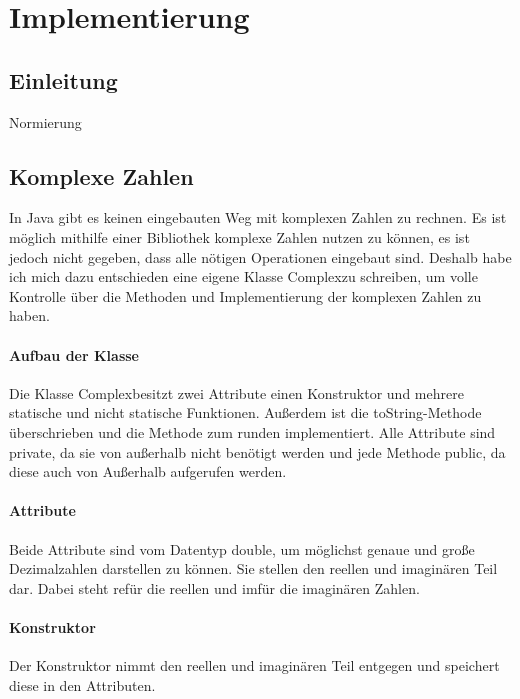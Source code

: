 \documentclass[12pt]{article}
\begin{document}
\section{Implementierung}
\subsection{Einleitung}
Normierung
\subsection{Komplexe Zahlen}
In Java gibt es keinen eingebauten Weg mit komplexen Zahlen zu rechnen. Es ist möglich mithilfe einer Bibliothek komplexe Zahlen nutzen zu können, es ist jedoch nicht gegeben, dass alle nötigen Operationen eingebaut sind. Deshalb habe ich mich dazu entschieden eine eigene Klasse \glqq Complex\grqq zu schreiben, um volle Kontrolle über die Methoden und Implementierung der komplexen Zahlen zu haben.

\paragraph{Aufbau der Klasse}
Die Klasse \glqq Complex\glqq\space besitzt zwei Attribute einen Konstruktor und mehrere statische und nicht statische Funktionen. Außerdem ist die \glqq toString\glqq-Methode überschrieben und die Methode zum runden implementiert. Alle Attribute sind \glqq private\grqq, da sie von außerhalb nicht benötigt werden und jede Methode \glqq public\glqq, da diese auch von Außerhalb aufgerufen werden.

\paragraph{Attribute}
Beide Attribute sind vom Datentyp \glqq double\grqq, um möglichst genaue und große Dezimalzahlen darstellen zu können. Sie stellen den reellen und imaginären Teil dar. Dabei steht \glqq re\grqq\space für die reellen und \glqq im\grqq\space für die imaginären Zahlen.

\paragraph{Konstruktor}
Der Konstruktor nimmt den reellen und imaginären Teil entgegen und speichert diese in den Attributen.
\end{document}
